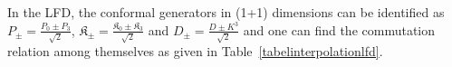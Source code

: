 \documentclass[%
 reprint,
superscriptaddress,
 amsmath,amssymb,
 aps,
]{revtex4-2}
\begin{document}
In the LFD, the conformal generators in (1+1) dimensions can be identified as 
$P_{\pm}=\frac{P_{0}\pm P_{3}}{\sqrt{2}}$, $\mathfrak{K}_{\pm}=\frac{\mathfrak{K}_{0}\pm \mathfrak{K}_{3}}{\sqrt{2}}$ and $D_{\pm}=\frac{D\pm{K^{3}}}{\sqrt{2}}$ and one can find the commutation relation among themselves 
as given in Table~\ref{tabelinterpolationlfd}.
\begin{comment}
\begin{table}[h!]
\centering
\caption{\label{tabelinterpolationlfd}$1+1$ conformal algebra in LFD}
\scalebox{0.8}{
\begin{tabular}{ |c||c|c|c|c|c|c|c|c|c|c|c|c|c|c|c|c|c|c|c| } 
 \hline
 \rule{0pt}{16pt} &  $\mathfrak{K}_{{-}}$&$P_{{+}}$& $D_{-}$  &   $\mathfrak{K}_{{+}}$  &$P_{{-}}$ & $D_+$ \\
 \hline
  \hline
 \rule{0pt}{16pt}$\mathfrak{K}_{{-}}$ &$0$&$-2\sqrt{2}iD_{-}$&$-\sqrt{2}i\mathfrak{K}_{{-}}$&0&0&$0$\\
 \hline 
 \rule{0pt}{16pt}  $P_{{+}}$ &$2\sqrt{2}iD_{-}$&0&$\sqrt{2}iP_{+}$&0&$0$&$0$\\
 \hline 
  \rule{0pt}{16pt}$D_{-}$ &$\sqrt{2}i\mathfrak{K}_{{-}}$&$-\sqrt{2}iP_{{+}}$&$0$&$0$&0&0\\
 \hline
 \rule{0pt}{16pt}$\mathfrak{K}_{{+}}$ &$0$&$0$&0&0&$-2\sqrt{2}iD_{+}$&$-\sqrt{2}i\mathfrak{K}_{{+}}$\\
 \hline 
 \rule{0pt}{16pt}$P_{{-}}$ &0&0&0&$2\sqrt{2}iD_{+}$&$0$&$\sqrt{2}iP_{{-}}$\\
 \hline 
 \rule{0pt}{16pt}$D_{+}$ &$0$&$0$&0&$-\sqrt{2}iP_{{-}}$&$\sqrt{2}i\mathfrak{K}_{{+}}$&0\\
 \hline 
\end{tabular}}
\end{table}
\end{comment}
\end{document}
